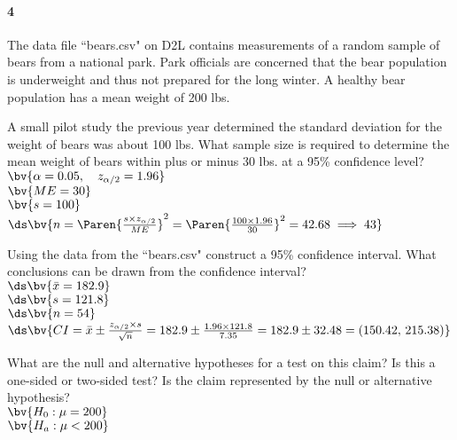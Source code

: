 \documentclass{article}
\begin{document}
\begin{flushleft}
\begin{enumalpha}
\end{enumalpha}

\newpage
\paragraph{4} The data file ``bears.csv" on D2L contains measurements of a random sample of bears from a national park. Park officials are concerned that the bear population is underweight and thus not prepared for the long winter. A healthy bear population has a mean weight of 200 lbs.
\begin{enumalpha}
\item A small pilot study the previous year determined the standard deviation for the weight of bears was about 100 lbs. What sample size is required to determine the mean weight of bears within plus or minus 30 lbs. at a 95\% confidence level?\\
\medskip
$\bv{\alpha = 0.05, \quad z_{\alpha/2} = 1.96}$\\
$\bv{ME = 30}$\\
$\bv{s = 100}$\\ \bigskip
$\ds \bv{n = \Paren{\frac{s \times z_{\alpha/2}}{ME}}^2 = \Paren{\frac{100 \times 1.96}{30}}^2 = 42.68 \implies 43}$
\vspace{0.5in}


\item Using the data from the ``bears.csv" construct a 95\% confidence interval.  What conclusions can be drawn from the confidence interval?\\
\bigskip
$\ds \bv{\bar x = 182.9}$\\
$\ds \bv{s = 121.8}$\\
$\ds \bv{n = 54}$\\
\medskip
$\ds \bv{CI = \bar x \pm \frac{z_{\alpha/2} \times s}{\sqrt{n} } = 182.9 \pm \frac{1.96 \times 121.8}{7.35} = 182.9 \pm 32.48 = (150.42, \, 215.38)}$\\
\bigskip
{}
\vspace{0.5in}


\item What are the null and alternative hypotheses for a test on this claim? Is this a one-sided or two-sided test? Is the claim represented by the null or alternative hypothesis?\\
\medskip
$\bv{H_0: \mu = 200}$\\
$\bv{H_a: \mu < 200}$\\
\\
\vspace{.5in}
\end{enumalpha}



\end{flushleft}
\end{document}
